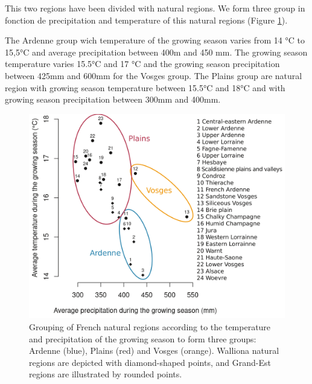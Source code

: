 \documentclass[3p,procedia]{elsarticle}
\begin{document}
This two  regions have been divided with natural regions. We form three group in fonction de precipitation and temperature of this natural regions (Figure \ref{fig:clim}).

The Ardenne group wich temperature of the growing season varies from 14 °C to 15,5°C and average precipitation between 400m and 450 mm. 
The growing season  temperature varies 15.5°C and 17 °C and the growing season  precipitation between 425mm and 600mm for the Vosges group.
The Plains group are natural region with  growing season  temperature between 15.5°C and 18°C and with growing season  precipitation between 300mm and 400mm.

 

\begin{figure}
	\centering
\includegraphics[width=\textwidth]{climat/climat_region.png}
\caption{Grouping of French natural regions according to the temperature and precipitation of the growing season to form three groups: Ardenne (blue), Plains (red) and Vosges (orange). Walliona natural regions are depicted with diamond-shaped points, and Grand-Est regions are illustrated by rounded points.}
	\label{fig:clim}
\end{figure}

\end{document}
